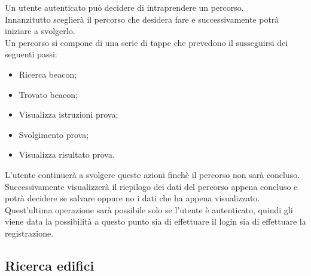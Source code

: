 Un utente autenticato può decidere di intraprendere un percorso. \\ 
Innanzitutto sceglierà il percorso che desidera fare e successivamente potrà iniziare a svolgerlo. \\ Un percorso si compone di una serie di tappe che prevedono il susseguirsi dei seguenti passi:
\begin{itemize}
	\item Ricerca beacon;
	\item Trovato beacon;
	\item Visualizza istruzioni prova;
	\item Svolgimento prova;
	\item Visualizza risultato prova.
\end{itemize}
L'utente continuerà a svolgere queste azioni finchè il percorso non sarà concluso. Successivamente visualizzerà il riepilogo dei dati del percorso appena concluso e potrà decidere se salvare oppure no i dati che ha appena visualizzato. Quest'ultima operazione sarà possibile solo se l'utente è autenticato, quindi gli viene data la possibilità a questo punto sia di effettuare il login sia di effettuare la registrazione.

\subsection{Ricerca edifici}

